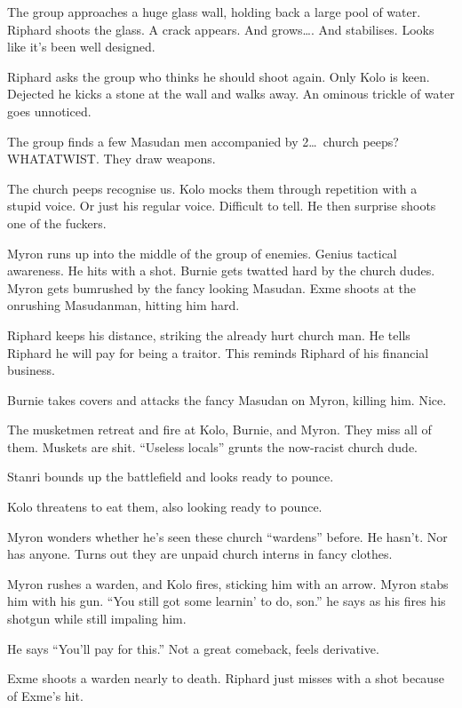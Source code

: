 The group approaches a huge glass wall, holding back a large pool of water. Riphard shoots the glass. A crack appears. And grows\ldots. And stabilises. Looks like it's been well designed.\medskip

Riphard asks the group who thinks he should shoot again. Only Kolo is keen. Dejected he kicks a stone at the wall and walks away. An ominous trickle of water goes unnoticed.\medskip

The group finds a few Masudan men accompanied by 2\ldots\ church peeps? WHATATWIST. They draw weapons.\medskip

The church peeps recognise us. Kolo mocks them through repetition with a stupid voice. Or just his regular voice. Difficult to tell. He then surprise shoots one of the fuckers.\medskip

Myron runs up into the middle of the group of enemies. Genius tactical awareness. He hits with a shot. Burnie gets twatted hard by the church dudes. Myron gets bumrushed by the fancy looking Masudan. Exme shoots at the onrushing Masudanman, hitting him hard.\medskip

Riphard keeps his distance, striking the already hurt church man. He tells Riphard he will pay for being a traitor. This reminds Riphard of his financial business.\medskip

Burnie takes covers and attacks the fancy Masudan on Myron, killing him. Nice.\medskip

The musketmen retreat and fire at Kolo, Burnie, and Myron. They miss all of them. Muskets are shit. ``Useless locals'' grunts the now-racist church dude.\medskip

Stanri bounds up the battlefield and looks ready to pounce.\medskip

Kolo threatens to eat them, also looking ready to pounce.\medskip

Myron wonders whether he's seen these church ``wardens'' before. He hasn't. Nor has anyone. Turns out they are unpaid church interns in fancy clothes.\medskip

Myron rushes a warden, and Kolo fires, sticking him with an arrow. Myron stabs him with his gun. ``You still got some learnin' to do, son.'' he says as his fires his shotgun while still impaling him.\medskip

He says ``You'll pay for this.'' Not a great comeback, feels derivative.\medskip

Exme shoots a warden nearly to death. Riphard just misses with a shot because of Exme's hit.\medskip

